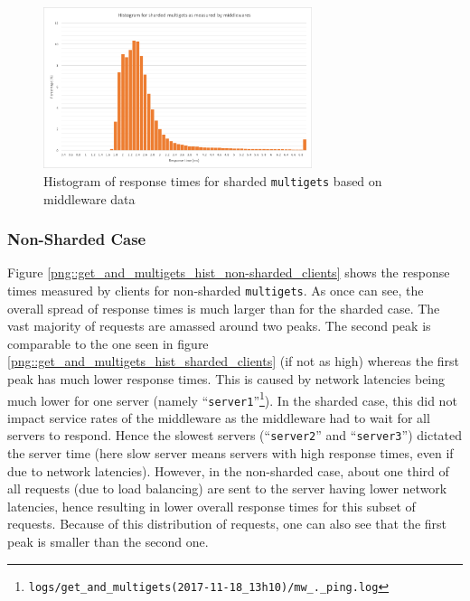 \documentclass[11pt,a4paper]{article}
\begin{document}
\begin{figure}[!h]
    \centering
    \includegraphics[width=0.7\textwidth]{processing/graphics/get_and_multigets_hist_sharded_mws.png}
    \caption{Histogram of response times for sharded \texttt{multigets} based on middleware data}
    \label{png::get_and_multigets_hist_sharded_mws}
\end{figure}

\subsubsection{Non-Sharded Case}
Figure \ref{png::get_and_multigets_hist_non-sharded_clients} shows the response times measured by clients for non-sharded \texttt{multigets}. As once can see, the overall spread of response times is much larger than for the sharded case. The vast majority of requests are amassed around two peaks. The second peak is comparable to the one seen in figure \ref{png::get_and_multigets_hist_sharded_clients} (if not as high) whereas the first peak has much lower response times. This is caused by network latencies being much lower for one server (namely ``\texttt{server1}''\footnote{\texttt{logs/get_and_multigets(2017-11-18_13h10)/mw_._ping.log}}). In the sharded case, this did not impact service rates of the middleware as the middleware had to wait for all servers to respond. Hence the slowest servers (``\texttt{server2}'' and ``\texttt{server3}'') dictated the server time (here slow server means servers with high response times, even if due to network latencies). However, in the non-sharded case, about one third of all requests (due to load balancing) are sent to the server having lower network latencies, hence resulting in lower overall response times for this subset of requests. Because of this distribution of requests, one can also see that the first peak is smaller than the second one.
\end{document}
